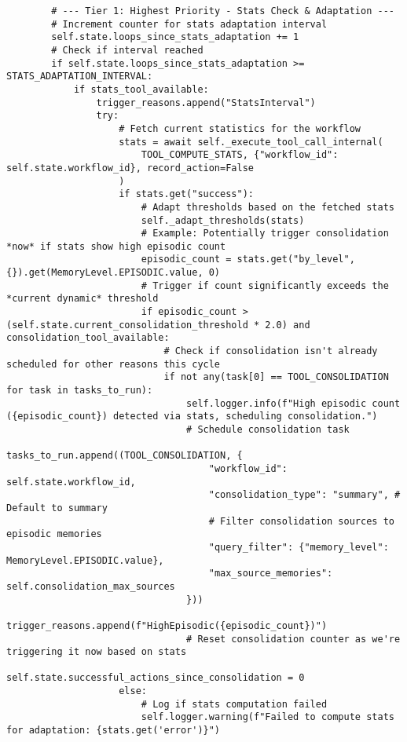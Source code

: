 \documentclass[12pt,a4paper]{article}
\begin{document}
\begin{pageablecode}
\begin{verbatim}
        # --- Tier 1: Highest Priority - Stats Check & Adaptation ---
        # Increment counter for stats adaptation interval
        self.state.loops_since_stats_adaptation += 1
        # Check if interval reached
        if self.state.loops_since_stats_adaptation >= STATS_ADAPTATION_INTERVAL:
            if stats_tool_available:
                trigger_reasons.append("StatsInterval")
                try:
                    # Fetch current statistics for the workflow
                    stats = await self._execute_tool_call_internal(
                        TOOL_COMPUTE_STATS, {"workflow_id": self.state.workflow_id}, record_action=False
                    )
                    if stats.get("success"):
                        # Adapt thresholds based on the fetched stats
                        self._adapt_thresholds(stats)
                        # Example: Potentially trigger consolidation *now* if stats show high episodic count
                        episodic_count = stats.get("by_level", {}).get(MemoryLevel.EPISODIC.value, 0)
                        # Trigger if count significantly exceeds the *current dynamic* threshold
                        if episodic_count > (self.state.current_consolidation_threshold * 2.0) and consolidation_tool_available:
                            # Check if consolidation isn't already scheduled for other reasons this cycle
                            if not any(task[0] == TOOL_CONSOLIDATION for task in tasks_to_run):
                                self.logger.info(f"High episodic count ({episodic_count}) detected via stats, scheduling consolidation.")
                                # Schedule consolidation task
                                tasks_to_run.append((TOOL_CONSOLIDATION, {
                                    "workflow_id": self.state.workflow_id,
                                    "consolidation_type": "summary", # Default to summary
                                    # Filter consolidation sources to episodic memories
                                    "query_filter": {"memory_level": MemoryLevel.EPISODIC.value},
                                    "max_source_memories": self.consolidation_max_sources
                                }))
                                trigger_reasons.append(f"HighEpisodic({episodic_count})")
                                # Reset consolidation counter as we're triggering it now based on stats
                                self.state.successful_actions_since_consolidation = 0
                    else:
                        # Log if stats computation failed
                        self.logger.warning(f"Failed to compute stats for adaptation: {stats.get('error')}")

\end{verbatim}
\end{pageablecode}
\end{document}
